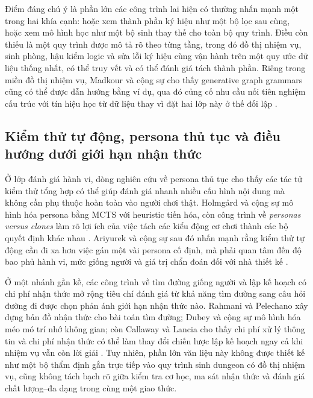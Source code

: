 \documentclass[oneside,a4paper,12pt]{extreport}
\begin{document}
Điểm đáng chú ý là phần lớn các công trình lai hiện có thường nhấn mạnh một trong hai khía cạnh: hoặc xem thành phần ký hiệu như một bộ lọc sau cùng, hoặc xem mô hình học như một bộ sinh thay thế cho toàn bộ quy trình. Điều còn thiếu là một quy trình được mô tả rõ theo từng tầng, trong đó đồ thị nhiệm vụ, sinh phòng, hậu kiểm logic và sửa lỗi ký hiệu cùng vận hành trên một quy ước dữ liệu thống nhất, có thể truy vết và có thể đánh giá tách thành phần. Riêng trong miền đồ thị nhiệm vụ, Madkour và cộng sự cho thấy generative graph grammars cũng có thể được dẫn hướng bằng ví dụ, qua đó củng cố nhu cầu nối tiên nghiệm cấu trúc với tín hiệu học từ dữ liệu thay vì đặt hai lớp này ở thế đối lập \cite{madkour2021guidinggg}.

\subsection{Kiểm thử tự động, persona thủ tục và điều hướng dưới giới hạn nhận thức}
Ở lớp đánh giá hành vi, dòng nghiên cứu về persona thủ tục cho thấy các tác tử kiểm thử tổng hợp có thể giúp đánh giá nhanh nhiều cấu hình nội dung mà không cần phụ thuộc hoàn toàn vào người chơi thật. Holmg{\aa}rd và cộng sự mô hình hóa persona bằng MCTS với heuristic tiến hóa, còn công trình về \emph{personas versus clones} làm rõ lợi ích của việc tách các kiểu động cơ chơi thành các bộ quyết định khác nhau \cite{holmgard2016personasclones,holmgard2018proceduralpersonas}. Ariyurek và cộng sự sau đó nhấn mạnh rằng kiểm thử tự động cần đi xa hơn việc gán một vài persona cố định, mà phải quan tâm đến độ bao phủ hành vi, mức giống người và giá trị chẩn đoán đối với nhà thiết kế \cite{ariyurek2023beyondpersonas}.

Ở một nhánh gần kề, các công trình về tìm đường giống người và lập kế hoạch có chi phí nhận thức mở rộng tiêu chí đánh giá từ khả năng tìm đường sang câu hỏi đường đi được chọn phản ánh giới hạn nhận thức nào. Rahmani và Pelechano xây dựng bản đồ nhận thức cho bài toán tìm đường; Dubey và cộng sự mô hình hóa méo mó trí nhớ không gian; còn Callaway và Lancia cho thấy chi phí xử lý thông tin và chi phí nhận thức có thể làm thay đổi chiến lược lập kế hoạch ngay cả khi nhiệm vụ vẫn còn lời giải \cite{rahmani2022humanlikepath,dubey2022cognitivepath,callaway2022cognitiveresources,lancia2023inforl}. Tuy nhiên, phần lớn văn liệu này không được thiết kế như một bộ thẩm định gắn trực tiếp vào quy trình sinh dungeon có đồ thị nhiệm vụ, cũng không tách bạch rõ giữa kiểm tra cơ học, ma sát nhận thức và đánh giá chất lượng--đa dạng trong cùng một giao thức.
\end{document}
